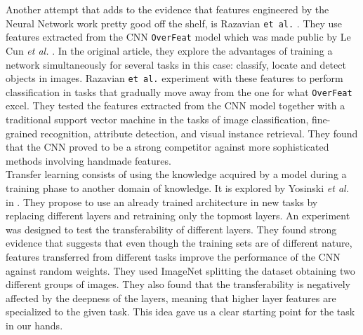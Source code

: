 Another attempt that adds to the evidence that features engineered by the Neural Network work pretty good off the shelf, is Razavian \texttt{et al.} \cite{DBLP:journals/corr/RazavianASC14}. They use features extracted from the CNN \texttt{OverFeat} model which was made public by Le Cun \textit{et al.} \cite{DBLP:journals/corr/SermanetEZMFL13}. In the original article, they explore the advantages of training a network simultaneously for several tasks in this case: classify, locate and detect objects in images. Razavian \texttt{et al.} experiment with these features to perform classification in tasks that gradually move away from the one for what \texttt{OverFeat} excel. They tested the features extracted from the CNN model together with a traditional support vector machine in the tasks of image classification, fine-grained recognition, attribute detection, and visual instance retrieval. They found that the CNN proved to be a strong competitor against more sophisticated methods involving handmade features.\\

Transfer learning consists of using the knowledge acquired by a model during a training phase to another domain of knowledge. It is explored by Yosinski \textit{et al.} in \cite{DBLP:journals/corr/YosinskiCBL14}. They propose to use an already trained architecture in new tasks by replacing different layers and retraining only the topmost layers. An experiment was designed to test the transferability of different layers. They found strong evidence that suggests that even though the training sets are of different nature, features transferred from different tasks improve the performance of the CNN against random weights. They used ImageNet \cite{Deng09imagenet:a} splitting the dataset obtaining two different groups of images. They also found that the transferability is negatively affected by the deepness of the layers, meaning that higher layer features are specialized to the given task. This idea gave us a clear starting point for the task in our hands.\\

